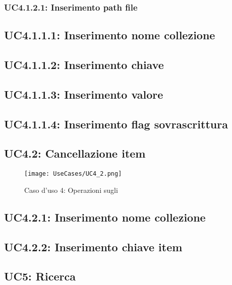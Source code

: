 \documentclass{scalatekids-article}
\begin{document}
\subsubsection{UC4.1.2.1: Inserimento path file}

\subsection{UC4.1.1.1: Inserimento nome collezione}

\subsection{UC4.1.1.2: Inserimento chiave}

\subsection{UC4.1.1.3: Inserimento valore}

\subsection{UC4.1.1.4: Inserimento flag sovrascrittura}

\subsection{UC4.2: Cancellazione item}

\begin{figure}[H]
  \begin{center}
    \texttt{[image: UseCases/UC4\_2.png]}
    \caption*{Caso d'uso 4: Operazioni sugli }
  \end{center}
\end{figure}

\subsection{UC4.2.1: Inserimento nome collezione}

\subsection{UC4.2.2: Inserimento chiave item}

\subsection{UC5: Ricerca}
\end{document}
